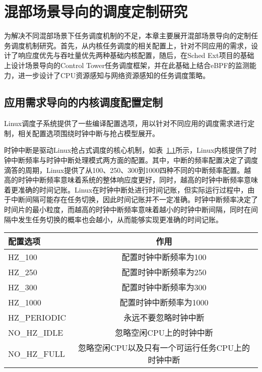 \chapter{混部场景导向的调度定制研究}\label{chap:sched_policy}


为解决不同混部场景下任务调度机制的不足，本章主要展开混部场景导向的定制任务调度机制研究。首先，从内核任务调度的相关配置上，针对不同应用的需求，设计了响应度优先与吞吐量优先两种基础内核配置，随后，在Sched Ext项目的基础上设计场景导向的Control Tower任务调度框架，并在此基础上结合eBPF的监测能力，进一步设计了CPU资源感知与网络资源感知的任务调度策略。

\section{应用需求导向的内核调度配置定制}

Linux调度子系统提供了一些编译配置选项，用以针对不同应用的调度需求进行定制，相关配置选项围绕时钟中断与抢占模型展开。

时钟中断是驱动Linux抢占式调度的核心机制，如表~\ref{tab:config_hz}所示，Linux内核提供了时钟中断频率与时钟中断处理模式两方面的配置。其中，中断的频率配置决定了调度滴答的周期，Linux提供了从100、250、300到1000四种不同的中断频率配置。越高的时钟中断频率意味着系统的整体响应度更好，同时，越高的时钟中断频率意味着更准确的时间记账。Linux在时钟中断处进行时间记账，但实际运行过程中，由于中断间隔可能存在任务切换，因此时间记账并不一定准确。时钟中断频率决定了时间片的最小粒度，而越高的时钟中断频率意味着越小的时钟中断间隔，同时在间隔中发生任务切换的概率也会越小，从而能够实现更准确的时间记账。

\begin{table}[H]
    \label{tab:config_hz}
    \footnotesize%
    \setlength{\tabcolsep}{4pt}%
    \renewcommand{\arraystretch}{1.25}%
    \centering
    \begin{tabular}{lc}
        \hline
        配置选项 & 作用 \\
        \hline
        HZ\_100  & 配置时钟中断频率为100  \\
        HZ\_250  & 配置时钟中断频率为250 \\
        HZ\_300  & 配置时钟中断频率为300 \\
        HZ\_1000 & 配置时钟中断频率为1000 \\
        HZ\_PERIODIC & 永远不要忽略时钟中断 \\
        NO\_HZ\_IDLE & 忽略空闲CPU上的时钟中断 \\
        NO\_HZ\_FULL & 忽略空闲CPU以及只有一个可运行任务CPU上的时钟中断 \\
        \hline
    \end{tabular}
\end{table}

